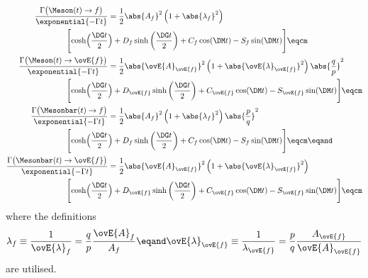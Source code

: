 \begin{equation}\label{eq:cpv_theory:flavour_physics:time_evolution:differential_decay_rates}
  \begin{split}
    \frac{\Gamma \bigl(\Meson   (t) \to       f \bigr)}{\exponential{-\Gamma t}} &= 
      \frac{1}{2} \abs{A_f}^2 \left( 1 + \abs{\lambda_f}^2 \right) \\
        \Biggl[ \cosh\Bigl(\frac{\DG t}{2}&\Bigr) + D_f \sinh\left(\frac{\DG t}{2}\right) + C_f \cos(\DM t) - S_f \sin(\DM t) \Biggr]\eqcm \\
    \frac{\Gamma \bigl(\Meson   (t) \to \ovE{f} \bigr)}{\exponential{-\Gamma t}} &= 
      \frac{1}{2} \abs{\ovE{A}_{\ovE{f}}}^2 \left( 1 + \abs{\ovE{\lambda}_{\ovE{f}}}^2 \right) \abs{\frac{q}{p}}^2 \\
        \Biggl[ \cosh\Bigl(\frac{\DG t}{2}&\Bigr) + D_{\ovE{f}} \sinh\left(\frac{\DG t}{2}\right) + C_{\ovE{f}} \cos(\DM t) - S_{\ovE{f}} \sin(\DM t) \Biggr]\eqcm \\
    \frac{\Gamma \bigl(\Mesonbar(t) \to       f \bigr)}{\exponential{-\Gamma t}} &= 
      \frac{1}{2} \abs{A_f}^2 \left( 1 + \abs{\lambda_f}^2 \right) \abs{\frac{p}{q}}^2 \\
        \Biggl[ \cosh\Bigl(\frac{\DG t}{2}&\Bigr) + D_f \sinh\left(\frac{\DG t}{2}\right) + C_f \cos(\DM t) - S_f \sin(\DM t) \Biggr]\eqcm\eqand \\
    \frac{\Gamma \bigl(\Mesonbar(t) \to \ovE{f} \bigr)}{\exponential{-\Gamma t}} &= 
      \frac{1}{2} \abs{\ovE{A}_{\ovE{f}}}^2 \left( 1 + \abs{\ovE{\lambda}_{\ovE{f}}}^2 \right) \\
        \Biggl[ \cosh\Bigl(\frac{\DG t}{2}&\Bigr) + D_{\ovE{f}} \sinh\left(\frac{\DG t}{2}\right) + C_{\ovE{f}} \cos(\DM t) - S_{\ovE{f}} \sin(\DM t) \Biggr]\eqcm \\
  \end{split}
\end{equation}
%
where the definitions
%
\begin{equation}\label{eq:cpv_theory:flavour_physics:time_evolution:lambdaf}
  \lambda_f               \equiv \frac{1}{\ovE{\lambda}_f}   = \frac{q}{p} \frac{\ovE{A}_f}{A_f} \eqand 
  \ovE{\lambda}_{\ovE{f}} \equiv \frac{1}{\lambda_{\ovE{f}}} = \frac{p}{q} \frac{A_{\ovE{f}}}{\ovE{A}_{\ovE{f}}}
\end{equation}
%
are utilised.


